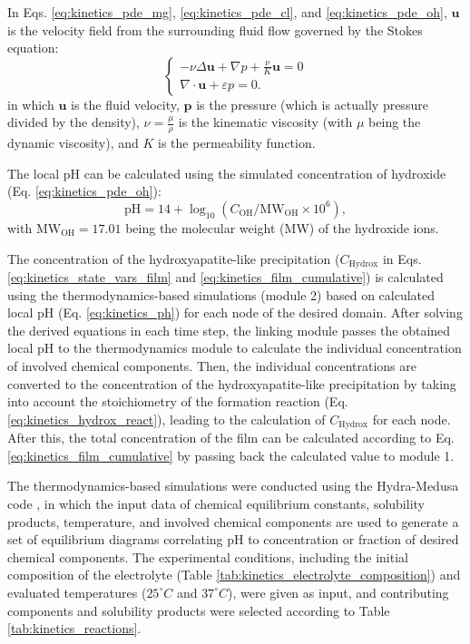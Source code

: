 In Eqs. \ref{eq:kinetics_pde_mg}, \ref{eq:kinetics_pde_cl}, and \ref{eq:kinetics_pde_oh}, $\mathbf{u}$ is the velocity field from the surrounding fluid flow governed by the Stokes equation:
\begin{equation} \label{eq:kinetics_stokes}
\left\{ {\begin{array}{*{20}{l}}
\displaystyle  {- \nu\Delta \mathbf{u} + \nabla p + \frac{\nu}{K} \mathbf{u} = 0} \\
\displaystyle  {\nabla\cdot\mathbf{u} + \varepsilon p = 0.}
\end{array}} \right.
\end{equation}
in which $\mathbf{u}$ is the fluid velocity, $\mathbf{p}$ is the pressure (which is actually pressure divided by the density), $\nu = \frac{\mu}{\rho}$ is the kinematic viscosity (with $\mu$ being the dynamic viscosity), and $K$ is the permeability function.


The local pH can be calculated using the simulated concentration of hydroxide (Eq. \ref{eq:kinetics_pde_oh}):
\begin{equation} \label{eq:kinetics_ph}
\mathrm{pH} = 14 + \log_{10}\left(C_{\mathrm{OH}} / \mathrm{MW}_{\mathrm{OH}} \times 10^6\right),
\end{equation}
with $\mathrm{MW}_{\mathrm{OH}}=17.01$ being the molecular weight (\gls{MW}) of the hydroxide ions.

The concentration of the hydroxyapatite-like precipitation ($C_{\mathrm{Hydrox}}$ in Eqs. \ref{eq:kinetics_state_vars_film} and \ref{eq:kinetics_film_cumulative}) is calculated using the thermodynamics-based simulations (module 2) based on calculated local pH (Eq. \ref{eq:kinetics_ph}) for each node of the desired domain. After solving the derived equations in each time step, the linking module passes the obtained local pH to the thermodynamics module to calculate the individual concentration of involved chemical components. Then, the individual concentrations are converted to the concentration of the hydroxyapatite-like precipitation by taking into account the stoichiometry of the formation reaction (Eq. \ref{eq:kinetics_hydrox_react}), leading to the calculation of $C_{\mathrm{Hydrox}}$ for each node. After this, the total concentration of the film can be calculated according to Eq. \ref{eq:kinetics_film_cumulative} by passing back the calculated value to module 1.

The thermodynamics-based simulations were conducted using the Hydra-Medusa code \cite{Ingri1967, Warnqvist1971, Eriksson1979}, in which the input data of chemical equilibrium constants, solubility products, temperature, and involved chemical components are used to generate a set of equilibrium diagrams correlating pH to concentration or fraction of desired chemical components. The experimental conditions, including the initial composition of the electrolyte (Table \ref{tab:kinetics_electrolyte_composition}) and evaluated temperatures ($25^{\circ}C$ and $37^{\circ}C$), were given as input, and contributing components and solubility products were selected according to Table \ref{tab:kinetics_reactions}.


